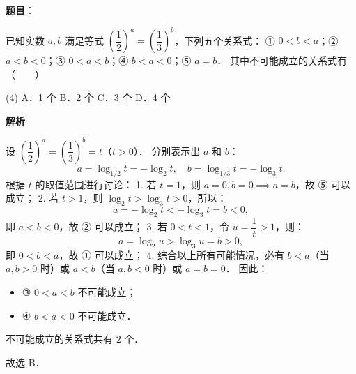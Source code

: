 \begin{answer}

\textbf{题目}：

已知实数 $a, b$ 满足等式 $\left(\dfrac{1}{2}\right)^a = \left(\dfrac{1}{3}\right)^b$，下列五个关系式：
① $0 < b < a$；② $a < b < 0$；③ $0 < a < b$；④ $b < a < 0$；⑤ $a = b$．
其中不可能成立的关系式有\mbox{（　　）}

\begin{gkopts}(4)
\task A．1 个
\task B．2 个
\task C．3 个
\task D．4 个
\end{gkopts}

\textbf{解析}

设 $\left(\dfrac{1}{2}\right)^a = \left(\dfrac{1}{3}\right)^b = t$（$t > 0$）．
分别表示出 $a$ 和 $b$：
\nopagebreak[4]
\[
a = \log_{1/2} t = -\log_2 t, \quad b = \log_{1/3} t = -\log_3 t.
\]
根据 $t$ 的取值范围进行讨论：
1. 若 $t = 1$，则 $a = 0, b = 0 \implies a = b$，故 ⑤ 可以成立；
2. 若 $t > 1$，则 $\log_2 t > \log_3 t > 0$，所以：
\nopagebreak[4]
\[
a = -\log_2 t < -\log_3 t = b < 0,
\]
   即 $a < b < 0$，故 ② 可以成立；
3. 若 $0 < t < 1$，令 $u = \dfrac{1}{t} > 1$，则：
\nopagebreak[4]
\[
a = \log_2 u > \log_3 u = b > 0,
\]
   即 $0 < b < a$，故 ① 可以成立；
4. 综合以上所有可能情况，必有 $b < a$（当 $a, b > 0$ 时）或 $a < b$（当 $a, b < 0$ 时）或 $a = b = 0$．
   因此：
\begin{itemize}
\item ③ $0 < a < b$ 不可能成立；
\item ④ $b < a < 0$ 不可能成立．
\end{itemize}
不可能成立的关系式共有 $2$ 个．

故选 B．


\end{answer}
